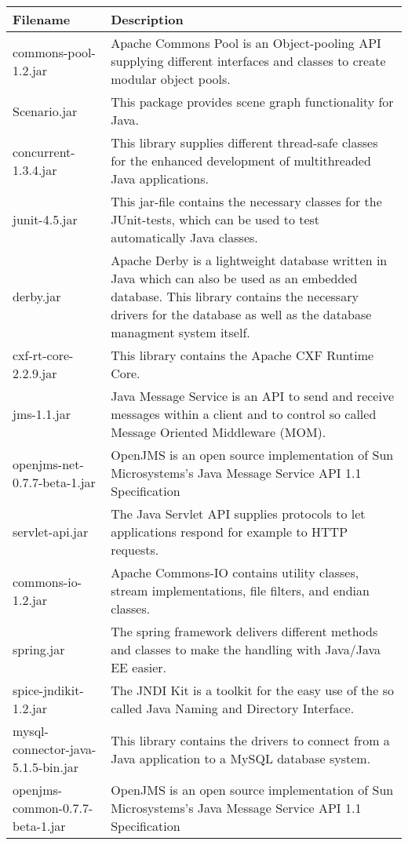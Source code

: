 \begin{center}
\begin{longtable}{|p{}|p{}|}
\hline 
Filename & Description\\
\hline
\hline 
commons-pool-1.2.jar & Apache Commons Pool is an Object-pooling API supplying different interfaces and classes to create modular object pools.\\
\hline 
Scenario.jar & This package provides scene graph functionality for Java.\\
\hline 
concurrent-1.3.4.jar & This library supplies different thread-safe classes for the enhanced development of multithreaded Java applications.\\
\hline 
junit-4.5.jar & This jar-file contains the necessary classes for the JUnit-tests, which can be used to test automatically Java classes.\\
\hline 
derby.jar & Apache Derby is a lightweight database written in Java which can also be used as an embedded database. This library contains the necessary drivers for the database as well as the database managment system itself.\\
\hline 
cxf-rt-core-2.2.9.jar & This library contains the Apache CXF Runtime Core. \\
\hline 
jms-1.1.jar & Java Message Service is an API to send and receive messages within a client and to control so called Message Oriented Middleware (MOM).\\
\hline 
openjms-net-0.7.7-beta-1.jar & OpenJMS is an open source implementation of Sun Microsystems's Java Message Service API 1.1 Specification\\
\hline 
servlet-api.jar & The Java Servlet API supplies protocols to let applications respond for example to HTTP requests.\\
\hline 
commons-io-1.2.jar & Apache Commons-IO contains utility classes, stream implementations, file filters, and endian classes.\\
\hline 
spring.jar & The spring framework delivers different methods and classes to make the handling with Java/Java EE easier.\\
\hline 
spice-jndikit-1.2.jar & The JNDI Kit is a toolkit for the easy use of the so called Java Naming and Directory Interface.\\
\hline 
mysql-connector-java-5.1.5-bin.jar & This library contains the drivers to connect from a Java application to a MySQL database system.\\
\hline 
openjms-common-0.7.7-beta-1.jar & OpenJMS is an open source implementation of Sun Microsystems's Java Message Service API 1.1 Specification\\

\end{longtable}
\end{center}
